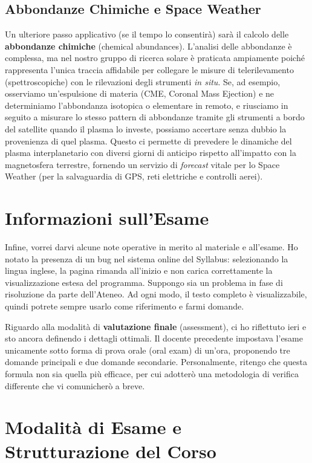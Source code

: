     \subsection{Abbondanze Chimiche e Space Weather}
    
    Un ulteriore passo applicativo (se il tempo lo consentirà) sarà il calcolo delle \textbf{abbondanze chimiche} (chemical abundances). L'analisi delle abbondanze è complessa, ma nel nostro gruppo di ricerca solare è praticata ampiamente poiché rappresenta l'unica traccia affidabile per collegare le misure di telerilevamento (spettroscopiche) con le rilevazioni degli strumenti \textit{in situ}.
    Se, ad esempio, osserviamo un'espulsione di materia (CME, Coronal Mass Ejection) e ne determiniamo l'abbondanza isotopica o elementare in remoto, e riusciamo in seguito a misurare lo stesso pattern di abbondanze tramite gli strumenti a bordo del satellite quando il plasma lo investe, possiamo accertare senza dubbio la provenienza di quel plasma. Questo ci permette di prevedere le dinamiche del plasma interplanetario con diversi giorni di anticipo rispetto all'impatto con la magnetosfera terrestre, fornendo un servizio di \textit{forecast} vitale per lo Space Weather (per la salvaguardia di GPS, reti elettriche e controlli aerei).
    
\section{Informazioni sull'Esame}

Infine, vorrei darvi alcune note operative in merito al materiale e all'esame.
Ho notato la presenza di un bug nel sistema online del Syllabus: selezionando la lingua inglese, la pagina rimanda all'inizio e non carica correttamente la visualizzazione estesa del programma. Suppongo sia un problema in fase di risoluzione da parte dell'Ateneo. Ad ogni modo, il testo completo è visualizzabile, quindi potrete sempre usarlo come riferimento e farmi domande.

Riguardo alla modalità di \textbf{valutazione finale} (assessment), ci ho riflettuto ieri e sto ancora definendo i dettagli ottimali. Il docente precedente impostava l'esame unicamente sotto forma di prova orale (oral exam) di un'ora, proponendo tre domande principali e due domande secondarie. Personalmente, ritengo che questa formula non sia quella più efficace, per cui adotterò una metodologia di verifica differente che vi comunicherò a breve.

\section{Modalità di Esame e Strutturazione del Corso}

